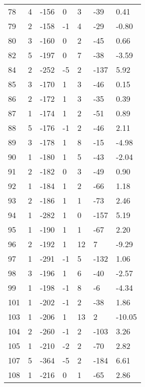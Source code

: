 \begin{appendices}
\begin{longtable}[c]{@{}lllllll@{}}
78 & 4 & -156 & 0 & 3 & -39 & 0.41 \\
\rowcolor[HTML]{FFCCC9}
79 & 2 & -158 & -1 & 4 & -29 & -0.80 \\
\rowcolor[HTML]{FFCCC9}
80 & 3 & -160 & 0 & 2 & -45 & 0.66 \\
\rowcolor[HTML]{FFCCC9}
82 & 5 & -197 & 0 & 7 & -38 & -3.59 \\
\rowcolor[HTML]{FFCCC9}
84 & 2 & -252 & -5 & 2 & -137 & 5.92 \\
\rowcolor[HTML]{FFCCC9}
85 & 3 & -170 & 1 & 3 & -46 & 0.15 \\
\rowcolor[HTML]{FFCCC9}
86 & 2 & -172 & 1 & 3 & -35 & 0.39 \\
\rowcolor[HTML]{FFCCC9}
87 & 1 & -174 & 1 & 2 & -51 & 0.89 \\
\rowcolor[HTML]{FFCCC9}
88 & 5 & -176 & -1 & 2 & -46 & 2.11 \\
\rowcolor[HTML]{FFCCC9}
89 & 3 & -178 & 1 & 8 & -15 & -4.98 \\
\rowcolor[HTML]{FFCCC9}
90 & 1 & -180 & 1 & 5 & -43 & -2.04 \\
\rowcolor[HTML]{FFCCC9}
91 & 2 & -182 & 0 & 3 & -49 & 0.90 \\
\rowcolor[HTML]{FFCCC9}
92 & 1 & -184 & 1 & 2 & -66 & 1.18 \\
\rowcolor[HTML]{FFCCC9}
93 & 2 & -186 & 1 & 1 & -73 & 2.46 \\
\rowcolor[HTML]{FFCCC9}
94 & 1 & -282 & 1 & 0 & -157 & 5.19 \\
\rowcolor[HTML]{FFCCC9}
95 & 1 & -190 & 1 & 1 & -67 & 2.20 \\
\rowcolor[HTML]{FFCCC9}
96 & 2 & -192 & 1 & 12 & 7 & -9.29 \\
\rowcolor[HTML]{FFCCC9}
97 & 1 & -291 & -1 & 5 & -132 & 1.06 \\
\rowcolor[HTML]{FFCCC9}
98 & 3 & -196 & 1 & 6 & -40 & -2.57 \\
\rowcolor[HTML]{FFCCC9}
99 & 1 & -198 & -1 & 8 & -6 & -4.34 \\
\rowcolor[HTML]{FFCCC9}
101 & 1 & -202 & -1 & 2 & -38 & 1.86 \\
\rowcolor[HTML]{FFCCC9}
103 & 1 & -206 & 1 & 13 & 2 & -10.05 \\
\rowcolor[HTML]{FFCCC9}
104 & 2 & -260 & -1 & 2 & -103 & 3.26 \\
\rowcolor[HTML]{FFCCC9}
105 & 1 & -210 & -2 & 2 & -70 & 2.82 \\
\rowcolor[HTML]{FFCCC9}
107 & 5 & -364 & -5 & 2 & -184 & 6.61 \\
\rowcolor[HTML]{FFCCC9}
108 & 1 & -216 & 0 & 1 & -65 & 2.86 \\

\end{longtable}
\end{appendices}
